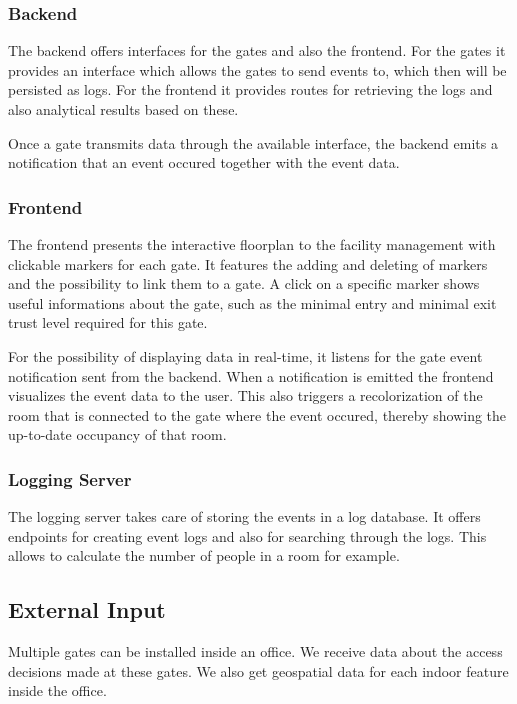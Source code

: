\subsubsection{Backend}
\label{Backend}

The backend offers interfaces for the gates and also the frontend. For the gates it provides an interface which allows the gates to send events to, which then will be persisted as logs.
For the frontend it provides routes for retrieving the logs and also analytical results based on these.

Once a gate transmits data through the available interface, the backend emits a notification that an event occured together with the event data. 


\subsubsection{Frontend}
\label{Frontend}

The frontend presents the interactive floorplan to the facility management with clickable markers for each gate.
It features the adding and deleting of markers and the possibility to link them to a gate.
A click on a specific marker shows useful informations about the gate, such as the minimal entry and minimal exit trust level required for this gate.

For the possibility of displaying data in real-time, it listens for the gate event notification sent from the backend. When a notification is emitted the frontend visualizes the event data to the user. This also triggers a recolorization of the room that is connected to the gate where the event occured, thereby showing the up-to-date occupancy of that room.

\subsubsection{Logging Server}
\label{Logging Server}

The logging server takes care of storing the events in a log database. It offers endpoints for creating event logs and also for searching through the logs. This allows to calculate the number of people in a room for example.

\subsection{External Input}

Multiple gates can be installed inside an office. We receive data about the access decisions made at these gates. We also get geospatial data for each indoor feature inside the office.

